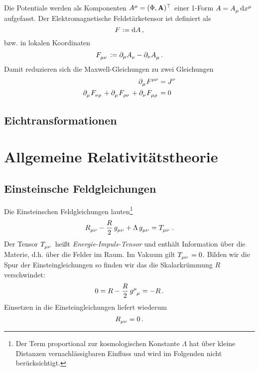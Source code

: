 Die Potentiale werden als Komponenten
$\tensor{A}{^\mu}=(\Phi,\vec{A})\transpose$ einer 1-Form
$A=\tensor{A}{_\mu}\dif\tensor{x}{^\mu}$ aufgefasst. Der Elektromagnetische Feldstärketensor ist definiert als
\begin{equation}
F:=\dif
A\,,
\end{equation}
bzw. in lokalen Koordinaten
\begin{equation}
\tensor{F}{_\mu_\nu}:=\partial_\mu\tensor{A}{_\nu}-\partial_\nu\tensor{A}{_\mu}\,.
\end{equation}
Damit reduzieren sich die Maxwell-Gleichungen zu zwei Gleichungen
\begin{align}
\pdif{_\mu}\tensor{F}{^\mu^\nu}&=\tensor{J}{^\nu}
\label{eq:MaxwellInhom}\\
\pdif{_{\mu}}\tensor{F}{_\nu_{\rho}}+
\pdif{_{\mu}}\tensor{F}{_\rho_{\nu}}+
\pdif{_{\nu}}\tensor{F}{_\mu_{\rho}}&=0
\label{eq:MaxwellHom}
\end{align}
\subsection{Eichtransformationen}
\section{Allgemeine Relativitätstheorie}
\subsection{Einsteinsche Feldgleichungen}
Die Einsteinschen Feldgleichungen lauten\footnote{Der Term proportional zur
kosmologischen Konstante $\Lambda$ hat über kleine Distanzen
vernachlässigbaren Einfluss und wird im Folgenden nicht berücksichtigt.}
\begin{equation}
\tensor{R}{_\mu_\nu} - \frac{R}{2}\, \tensor{g}{_\mu_\nu}
+\Lambda\, \tensor{g}{_\mu_\nu}
=\tensor{T}{_\mu_\nu}\,.
\end{equation}
Der Tensor $\tensor{T}{_\mu_\nu}$ heißt \emph{Energie-Impuls-Tensor} und
enthält Information über die Materie, d.h. über die Felder im Raum. Im Vakuum
gilt $\tensor{T}{_\mu_\nu}=0$.
Bilden wir die Spur der Einsteingleichungen so finden wir das die Skalarkrümmung
$R$ verschwindet:
\begin{equation}
0=R- \frac{R}{2}\, \tensor{g}{^\mu_\mu}= -R\,.
\end{equation}
Einsetzen in die Einsteingleichungen liefert wiederum
\begin{equation}
\tensor{R}{_\mu_\nu}=0\,.
\end{equation}
